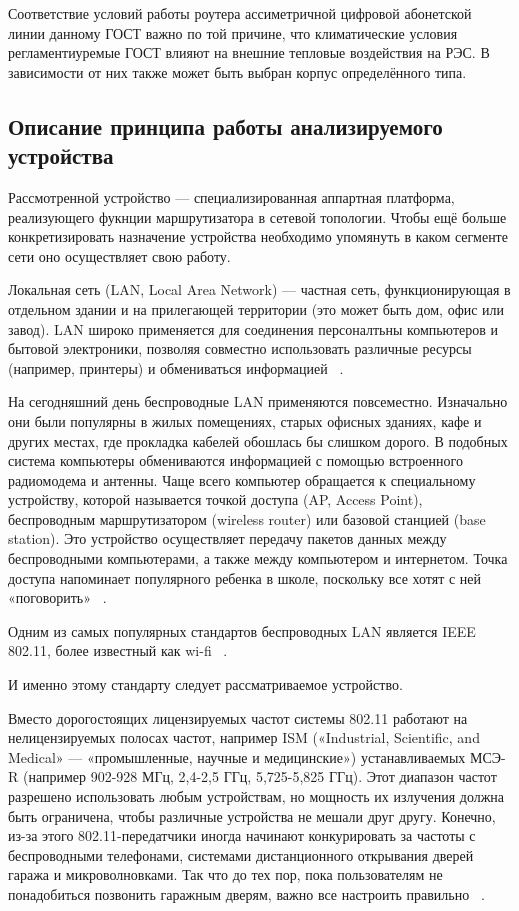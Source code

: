 Соответствие условий работы роутера ассиметричной цифровой абонетской
линии данному ГОСТ важно по той причине, что климатические условия
регламентиуремые ГОСТ влияют на внешние тепловые воздействия на РЭС.
В зависимости от них также может быть выбран корпус определённого
типа.

\subsection{Описание принципа работы анализируемого устройства}


Рассмотренной устройство — специализированная аппартная платформа,
реализующего фукнции маршрутизатора в сетевой топологии.  Чтобы ещё
больше конкретизировать назначение устройства необходимо упомянуть в
каком сегменте сети оно осуществляет свою работу.


Локальная сеть (LAN, Local Area Network) — частная сеть,
функционирующая в отдельном здании и на прилегающей территории
(это может быть дом, офис или завод). LAN широко применяется для соединения персоналтьны компьютеров и бытовой электроники, позволяя совместно
использовать различные ресурсы (например, принтеры) и обмениваться
информацией ~\cite{NetworksTanenbaum2023}.

На сегодняшний день беспроводные LAN применяются
повсеместно. Изначально они были популярны в жилых помещениях, старых
офисных зданиях, кафе и других местах, где прокладка кабелей обошлась
бы слишком дорого. В подобных система компьютеры обмениваются
информацией с помощью встроенного радиомодема и антенны. Чаще всего
компьютер обращается к специальному устройству, которой называется
точкой доступа (AP, Access Point), беспроводным маршрутизатором
(wireless router) или базовой станцией (base station). Это устройство
осуществляет передачу пакетов данных между беспроводными компьютерами,
а также между компьютером и интернетом. Точка доступа напоминает
популярного ребенка в школе, поскольку все хотят с ней «поговорить»
~\cite{NetworksTanenbaum2023}.

Одним из самых популярных стандартов беспроводных LAN является IEEE
802.11, более известный как wi-fi ~\cite{NetworksTanenbaum2023}.

И именно этому стандарту следует рассматриваемое устройство.

Вместо дорогостоящих лицензируемых частот системы 802.11 работают на
нелицензируемых полосах частот, например ISM («Industrial, Scientific,
and Medical» — «промышленные, научные и медицинские») устанавливаемых
МСЭ-R (например 902-928 МГц, 2,4-2,5 ГГц, 5,725-5,825 ГГц).  Этот
диапазон частот разрешено использовать любым устройствам, но мощность
их излучения должна быть ограничена, чтобы различные устройства не
мешали друг другу. Конечно, из-за этого 802.11-передатчики иногда
начинают конкурировать за частоты с беспроводными телефонами,
системами дистанционного открывания дверей гаража и микроволновками.
Так что до тех пор, пока пользователям не понадобиться позвонить
гаражным дверям, важно все настроить
правильно ~\cite{NetworksTanenbaum2023}.


